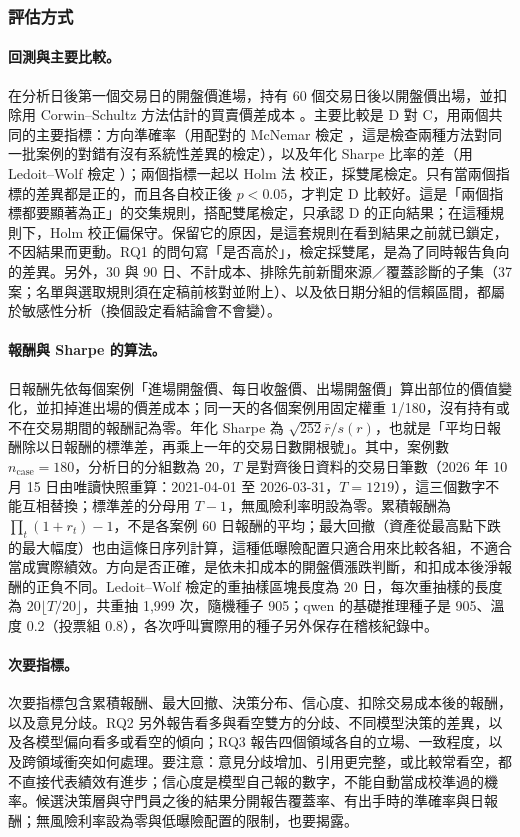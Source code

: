 \documentclass[12pt,a4paper]{article}
\numberwithin{table}{section}
\numberwithin{figure}{section}
\newcommand{\grp}[1]{\textsf{#1}}
\begin{document}
\subsubsection{評估方式}

\paragraph{回測與主要比較。} 在分析日後第一個交易日的開盤價進場，持有 60 個交易日後以開盤價出場，並扣除用 Corwin--Schultz 方法估計的買賣價差成本 \citep{corwin2012spread}。主要比較是 \grp{D} 對 \grp{C}，用兩個共同的主要指標：方向準確率（用配對的 McNemar 檢定 \citep{mcnemar1947}，這是檢查兩種方法對同一批案例的對錯有沒有系統性差異的檢定），以及年化 Sharpe 比率的差（用 Ledoit--Wolf 檢定 \citep{ledoit2008sharpe}）；兩個指標一起以 Holm 法 \citep{holm1979} 校正，採雙尾檢定。只有當兩個指標的差異都是正的，而且各自校正後 $p<0.05$，才判定 \grp{D} 比較好。這是「兩個指標都要顯著為正」的交集規則，搭配雙尾檢定，只承認 \grp{D} 的正向結果；在這種規則下，Holm 校正偏保守。保留它的原因，是這套規則在看到結果之前就已鎖定，不因結果而更動。RQ1 的問句寫「是否高於」，檢定採雙尾，是為了同時報告負向的差異。另外，30 與 90 日、不計成本、排除先前新聞來源／覆蓋診斷的子集（37 案；名單與選取規則須在定稿前核對並附上）、以及依日期分組的信賴區間，都屬於敏感性分析（換個設定看結論會不會變）。

\paragraph{報酬與 Sharpe 的算法。} 日報酬先依每個案例「進場開盤價、每日收盤價、出場開盤價」算出部位的價值變化，並扣掉進出場的價差成本；同一天的各個案例用固定權重 1/180，沒有持有或不在交易期間的報酬記為零。年化 Sharpe 為 $\sqrt{252}\bar r/s(r)$，也就是「平均日報酬除以日報酬的標準差，再乘上一年的交易日數開根號」。其中，案例數 $n_{\mathrm{case}}=180$，分析日的分組數為 20，$T$ 是對齊後日資料的交易日筆數（2026 年 10 月 15 日由唯讀快照重算：2021-04-01 至 2026-03-31，$T=1219$），這三個數字不能互相替換；標準差的分母用 $T-1$，無風險利率明設為零。累積報酬為 $\prod_t(1+r_t)-1$，不是各案例 60 日報酬的平均；最大回撤（資產從最高點下跌的最大幅度）也由這條日序列計算，這種低曝險配置只適合用來比較各組，不適合當成實際績效。方向是否正確，是依未扣成本的開盤價漲跌判斷，和扣成本後淨報酬的正負不同。Ledoit--Wolf 檢定的重抽樣區塊長度為 20 日，每次重抽樣的長度為 $20\lfloor T/20\rfloor$，共重抽 1,999 次，隨機種子 905；qwen 的基礎推理種子是 905、溫度 0.2（投票組 0.8），各次呼叫實際用的種子另外保存在稽核紀錄中。

\paragraph{次要指標。} 次要指標包含累積報酬、最大回撤、決策分布、信心度、扣除交易成本後的報酬，以及意見分歧。RQ2 另外報告看多與看空雙方的分歧、不同模型決策的差異，以及各模型偏向看多或看空的傾向；RQ3 報告四個領域各自的立場、一致程度，以及跨領域衝突如何處理。要注意：意見分歧增加、引用更完整，或比較常看空，都不直接代表績效有進步；信心度是模型自己報的數字，不能自動當成校準過的機率。候選決策層與守門員之後的結果分開報告覆蓋率、有出手時的準確率與日報酬；無風險利率設為零與低曝險配置的限制，也要揭露。
\end{document}
